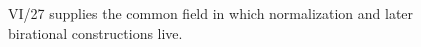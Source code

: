 \begin{figure}[htbp]\centering
{}
\caption{VI/27 supplies the common field in which normalization and later birational constructions live.}\label{fig:vi27-synthesis}\end{figure}
